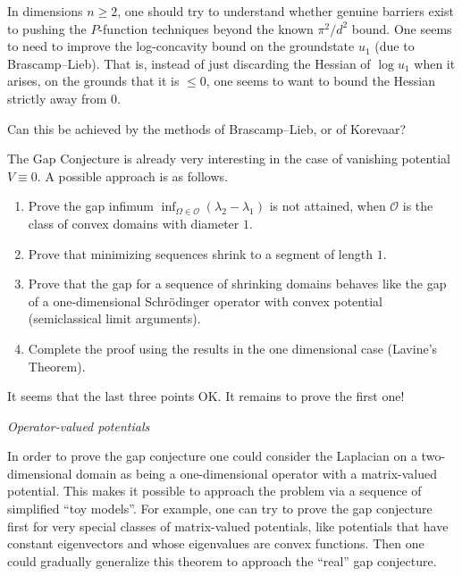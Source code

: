 \documentclass[12pt,letterpaper, reqno]{amsart}
\begin{document}
\begin{problemblock}

 In dimensions $n \geq 2$, one
should try to understand whether genuine barriers exist to pushing
the $P$-function techniques beyond the known $\pi^2/d^2$ bound. One
seems to need to improve the log-concavity bound on the groundstate
$u_1$ (due to Brascamp--Lieb). That is, instead of just discarding
the Hessian of $\log u_1$ when it arises, on the grounds that it is
$\leq 0$, one seems to want to bound the Hessian strictly away from
$0$.

\begin{problem}
 Can this be achieved by the methods of Brascamp--Lieb, or of
Korevaar?
\end{problem}
\end{problemblock}

\begin{problem}
  The Gap Conjecture is already
very interesting in the case of vanishing potential $V \equiv 0$. A
possible approach is as follows.
%
\begin{enumerate}
\item Prove the gap infimum $\inf_{\Omega \in \mathcal{O}} (\lambda_2-\lambda_1)$
is not attained, when $\mathcal{O}$ is the class of convex domains
with diameter $1$.

\item Prove that minimizing sequences shrink to a segment of
length $1$.

\item Prove that the gap for a sequence of shrinking domains
behaves like the gap of a one-dimensional Schr\"{o}dinger
operator with convex potential (semiclassical limit arguments).

\item Complete the proof using the results in the one dimensional case (Lavine's Theorem).
\end{enumerate}
%
It seems that the last three points OK. It remains to prove the first one!

\end{problem}


\begin{problemblock}
\emph{Operator-valued potentials}

\begin{problem}
  In order to prove the gap conjecture one could consider
the Laplacian on a two-dimensional domain as being a one-dimensional
operator with a matrix-valued potential. This makes it possible to
approach the problem via a sequence of simplified ``toy models''.
For example, one can try to prove the gap conjecture first for very
special classes of matrix-valued potentials, like potentials that
have constant eigenvectors and whose eigenvalues are convex
functions. Then one could gradually generalize this theorem to
approach the ``real'' gap conjecture.
\end{problem}

\end{problemblock}
\end{document}
